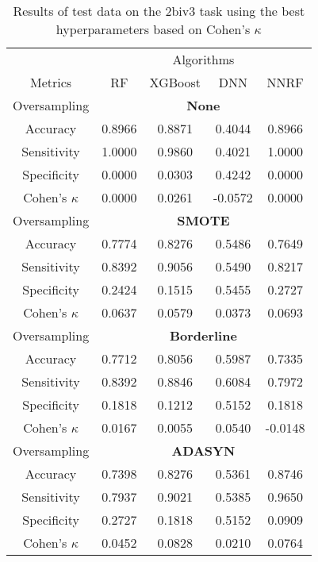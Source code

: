 \begin{table}[!htb]
\centering
\caption{Results of test data on the 2biv3 task using the best hyperparameters based on Cohen's $\kappa$}
\label{tab:2biv3_test_results}
\begin{tabular}{c | c c c c}
\hline
 & \multicolumn{4}{c}{Algorithms}\\ 
Metrics &RF & XGBoost & DNN & NNRF\\ 
\hline
Oversampling &\multicolumn{4}{|c}{\textbf{None}}\\ 
\hline
Accuracy & 0.8966 & 0.8871 & 0.4044 & 0.8966\\ 
Sensitivity & 1.0000 & 0.9860 & 0.4021 & 1.0000\\ 
Specificity & 0.0000 & 0.0303 & 0.4242 & 0.0000\\ 
Cohen's $\kappa$ & 0.0000 & 0.0261 & -0.0572 & 0.0000\\ 
\hline
Oversampling &\multicolumn{4}{|c}{\textbf{SMOTE}}\\ 
\hline
Accuracy & 0.7774 & 0.8276 & 0.5486 & 0.7649\\ 
Sensitivity & 0.8392 & 0.9056 & 0.5490 & 0.8217\\ 
Specificity & 0.2424 & 0.1515 & 0.5455 & 0.2727\\ 
Cohen's $\kappa$ & 0.0637 & 0.0579 & 0.0373 & 0.0693\\ 
\hline
Oversampling &\multicolumn{4}{|c}{\textbf{Borderline}}\\ 
\hline
Accuracy & 0.7712 & 0.8056 & 0.5987 & 0.7335\\ 
Sensitivity & 0.8392 & 0.8846 & 0.6084 & 0.7972\\ 
Specificity & 0.1818 & 0.1212 & 0.5152 & 0.1818\\ 
Cohen's $\kappa$ & 0.0167 & 0.0055 & 0.0540 & -0.0148\\ 
\hline
Oversampling &\multicolumn{4}{|c}{\textbf{ADASYN}}\\ 
\hline
Accuracy & 0.7398 & 0.8276 & 0.5361 & 0.8746\\ 
Sensitivity & 0.7937 & 0.9021 & 0.5385 & 0.9650\\ 
Specificity & 0.2727 & 0.1818 & 0.5152 & 0.0909\\ 
Cohen's $\kappa$ & 0.0452 & 0.0828 & 0.0210 & 0.0764\\ 
\hline
\end{tabular}
\end{table}

